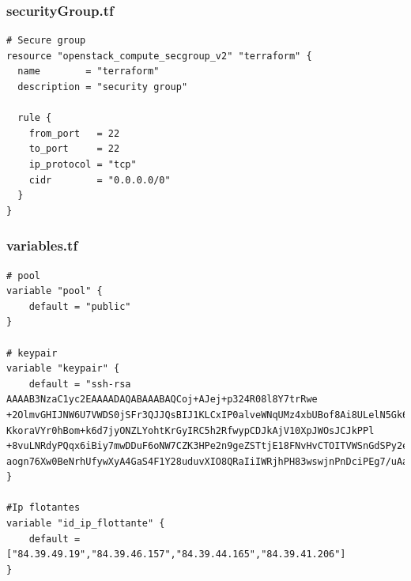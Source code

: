 \documentclass[]{article}
\begin{document}
\subsubsection*{securityGroup.tf}
\begin{verbatim}
# Secure group
resource "openstack_compute_secgroup_v2" "terraform" {
  name        = "terraform"
  description = "security group"
  
  rule {
    from_port   = 22
    to_port     = 22
    ip_protocol = "tcp"
    cidr        = "0.0.0.0/0"
  }
}
\end{verbatim}

\subsubsection*{variables.tf}
\begin{verbatim}
# pool
variable "pool" {
    default = "public"
}

# keypair
variable "keypair" {
    default = "ssh-rsa AAAAB3NzaC1yc2EAAAADAQABAAABAQCoj+AJej+p324R08l8Y7trRwe
+2OlmvGHIJNW6U7VWDS0jSFr3QJJQsBIJ1KLCxIP0alveWNqUMz4xbUBof8Ai8ULelN5Gk64EsRmkH2Bncxs
KkoraVYr0hBom+k6d7jyONZLYohtKrGyIRC5h2RfwypCDJkAjV10XpJWOsJCJkPPl
+8vuLNRdyPQqx6iBiy7mwDDuF6oNW7CZK3HPe2n9geZSTtjE18FNvHvCTOITVWSnGdSPy2e89ahemM0B3ROo
aogn76Xw0BeNrhUfywXyA4GaS4F1Y28uduvXIO8QRaIiIWRjhPH83wswjnPnDciPEg7/uAa/yZSy1SXFU5V"
}

#Ip flotantes
variable "id_ip_flottante" { 
    default = ["84.39.49.19","84.39.46.157","84.39.44.165","84.39.41.206"]
} 
\end{verbatim}
\end{document}
